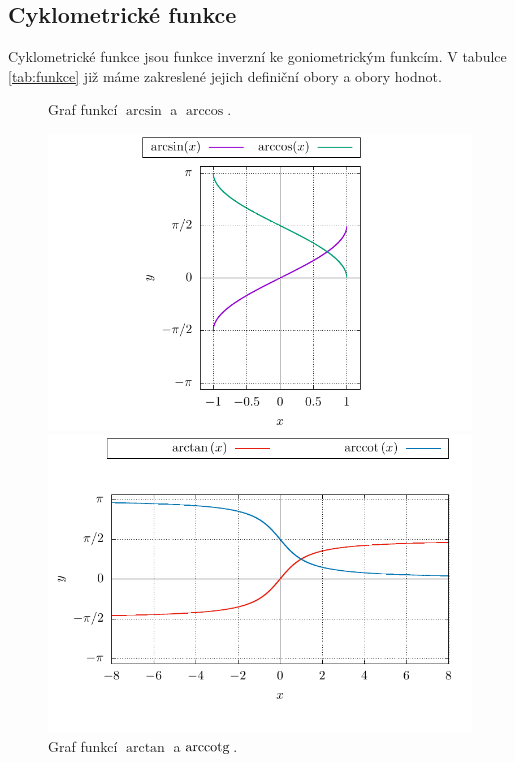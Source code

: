 \subsection{Cyklometrické funkce}

Cyklometrické funkce jsou funkce inverzní ke goniometrickým funkcím. V tabulce \ref{tab:funkce} již máme zakreslené jejich definiční obory a obory hodnot.

\begin{figure}[H]
    \centering
    \caption{Graf funkcí $\arcsin$ a $\arccos$.}
    \includegraphics{Gnuplot/Figures/arcsin-arccos.pdf}
    \newline
    \caption{Graf funkcí $\arctan$ a $\mathrm{arccotg}\,$.}
    \includegraphics{Gnuplot/Figures/arctg-arccotg.pdf}
    
\end{figure}
